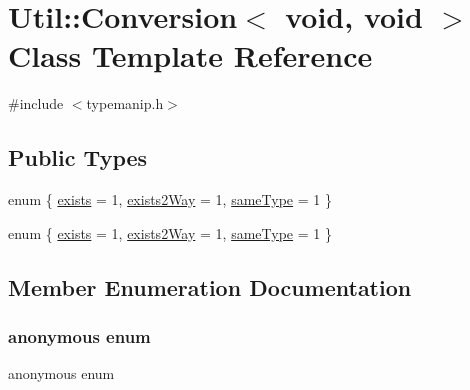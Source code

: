 \hypertarget{classUtil_1_1Conversion_3_01void_00_01void_01_4}{}\section{Util\+:\+:Conversion$<$ void, void $>$ Class Template Reference}
\label{classUtil_1_1Conversion_3_01void_00_01void_01_4}


{\ttfamily \#include $<$typemanip.\+h$>$}

\subsection*{Public Types}
\begin{DoxyCompactItemize}
\item 
enum \{ \mbox{\hyperlink{classUtil_1_1Conversion_3_01void_00_01void_01_4_ae2443c80dba697bea3fbc309abb9d785a18f7b2927082c753d071488aa02e4f93}{exists}} = 1, 
\mbox{\hyperlink{classUtil_1_1Conversion_3_01void_00_01void_01_4_ae2443c80dba697bea3fbc309abb9d785ac0140b4c4cc5e507e75a25225c4e582b}{exists2\+Way}} = 1, 
\mbox{\hyperlink{classUtil_1_1Conversion_3_01void_00_01void_01_4_ae2443c80dba697bea3fbc309abb9d785a46e61925c77304c10184471d7b52a8cd}{same\+Type}} = 1
 \}
\item 
enum \{ \mbox{\hyperlink{classUtil_1_1Conversion_3_01void_00_01void_01_4_ae2443c80dba697bea3fbc309abb9d785a18f7b2927082c753d071488aa02e4f93}{exists}} = 1, 
\mbox{\hyperlink{classUtil_1_1Conversion_3_01void_00_01void_01_4_ae2443c80dba697bea3fbc309abb9d785ac0140b4c4cc5e507e75a25225c4e582b}{exists2\+Way}} = 1, 
\mbox{\hyperlink{classUtil_1_1Conversion_3_01void_00_01void_01_4_ae2443c80dba697bea3fbc309abb9d785a46e61925c77304c10184471d7b52a8cd}{same\+Type}} = 1
 \}
\end{DoxyCompactItemize}


\subsection{Member Enumeration Documentation}
\mbox{\label{classUtil_1_1Conversion_3_01void_00_01void_01_4_af8cdbe252b89456d250a01848eb1752f}} 
\subsubsection{\texorpdfstring{anonymous enum}{anonymous enum}}
{\footnotesize\ttfamily anonymous enum}


